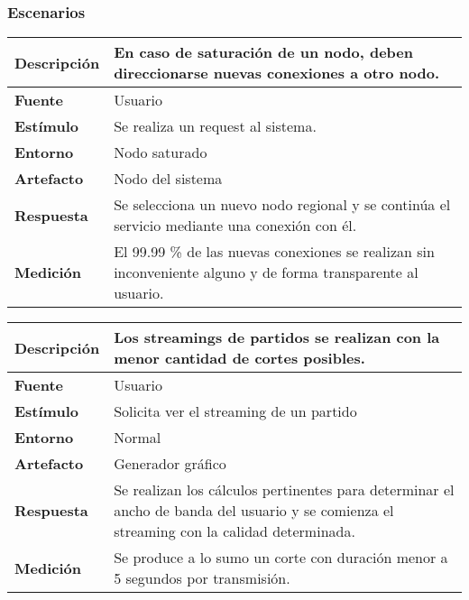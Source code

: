 \subsubsection*{Escenarios}
\begin{center}
  \begin{tabular}{| l | p{10cm} | }
    \hline
	\textbf{Descripción} & En caso de saturación de un nodo, deben direccionarse nuevas conexiones a otro nodo.\\  \hline
	\textbf{Fuente} & Usuario\\ \hline
	\textbf{Estímulo} & Se realiza un request al sistema.\\  \hline
	\textbf{Entorno} & Nodo saturado\\  \hline
	\textbf{Artefacto} & Nodo del sistema\\  \hline
	\textbf{Respuesta} & Se selecciona un nuevo nodo regional y se continúa el servicio mediante una conexión con él.\\  \hline
	\textbf{Medición} & El 99.99 \% de las nuevas conexiones se realizan sin inconveniente alguno y de forma transparente al usuario.\\  \hline
  \end{tabular}
\end{center} 


\begin{center}
  \begin{tabular}{| l | p{10cm} | }
    \hline
	\textbf{Descripción} & Los streamings de partidos se realizan con la menor cantidad de cortes posibles.\\  \hline
	\textbf{Fuente} & Usuario\\  \hline
	\textbf{Estímulo} & Solicita ver el streaming de un partido\\  \hline
	\textbf{Entorno} & Normal\\  \hline
	\textbf{Artefacto} & Generador gráfico\\  \hline
	\textbf{Respuesta} & Se realizan los cálculos pertinentes para determinar el ancho de banda del usuario y se comienza el streaming con la calidad determinada.\\  \hline
	\textbf{Medición} & Se produce a lo sumo un corte con duración menor a 5 segundos por transmisión.\\  \hline
  \end{tabular}
\end{center}

